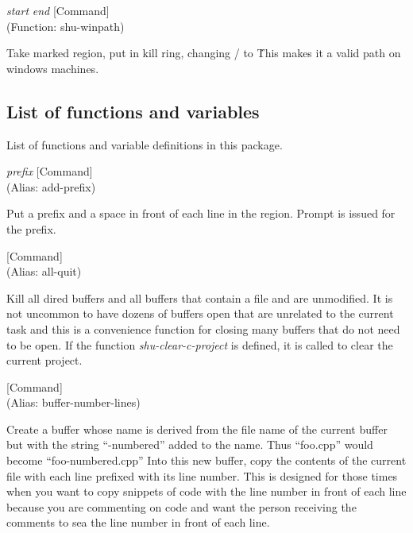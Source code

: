 \vspace{1em}
\noindent
{}
\usebox{\funcname}\emph{start} \emph{end}
 \hfill [Command]\\%
 (Function: shu-winpath)

\begin{doc-string}
Take marked region, put in kill ring, changing / to \.
This makes it a valid path on windows machines.
\end{doc-string}

\subsection{List of functions and variables}

List of functions and variable definitions in this package.



\vspace{1em}
\noindent
{}
\usebox{\funcname}\emph{prefix}
 \hfill [Command]\\%
 (Alias: add-prefix)

\begin{doc-string}
Put a prefix and a space in front of each line in the region.  Prompt is issued
for the prefix.
\end{doc-string}

\vspace{1em}
\noindent
{}
\usebox{\funcname}
 \hfill [Command]\\%
 (Alias: all-quit)

\begin{doc-string}
Kill all dired buffers and all buffers that contain a file and are unmodified.
It is not uncommon to have dozens of buffers open that are unrelated to the current task
and this is a convenience function for closing many buffers that do not need to
be open.
If the function \emph{shu-clear-c-project} is defined, it is called to clear the current
project.
\end{doc-string}

\vspace{1em}
\noindent
{}
\usebox{\funcname}
 \hfill [Command]\\%
 (Alias: buffer-number-lines)

\begin{doc-string}
Create a buffer whose name is derived from the file name of the current
buffer but with the string ``-numbered'' added to the name.  Thus ``foo.cpp''
would become ``foo-numbered.cpp'' Into this new buffer, copy the contents of the
current file with each line prefixed with its line number.  This is designed for
those times when you want to copy snippets of code with the line number in front
of each line because you are commenting on code and want the person receiving
the comments to sea the line number in front of each line.
\end{doc-string}

